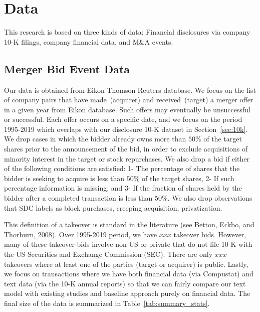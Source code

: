 \documentclass[11pt]{article}
\begin{document}
\section{Data}

This research is based on three kinds of data: Financial disclosures via
company 10-K filings, company financial data, and M\&A events.



\subsection{Merger Bid Event Data}

Our data is obtained from Eikon Thomson Reuters database. We focus on
the list of company pairs that have made~(acquirer) and received~(target) a merger offer in a given year from Eikon
database. Such offers may eventually be unsuccessful or successful. Each offer occurs on a specific date, and we focus on the period
1995-2019 which overlaps with our disclosure 10-K dataset in
Section~\ref{sec:10k}. We drop cases in which the bidder already owns more than $50\%$ of the target shares prior to
the announcement of the bid, in order to exclude acquisitions of
minority interest in the target or stock repurchases. We also drop a bid if either of the following conditions are
satisfied: 1- The percentage of shares that the bidder is seeking to acquire is less than $50\%$ of the target shares, 2- If
such percentage information is missing, and 3- If the fraction of shares held by the bidder after a completed
transaction is less than $50\%$. We also drop observations that SDC labels as block purchases, creeping
acquisition, privatization.

This definition of a takeover is standard in the literature (see Betton, Eckbo, and Thorburn, 2008).
Over 1995-2019 period, we have $xxx$ takeover bids. However, many of these takeover bids involve non-US or private that do
not file 10-K with the US Securities and Exchange Commission
(SEC). There are only $xxx$ takeovers where at least one of the parties
(target or acquirer) is public. Lastly, we focus on transactions where we have
both financial data (via Compustat) and text data (via the 10-K annual reports) so that
we can fairly compare our text model with existing studies and
baseline approach purely on financial data. The final size of the data is
summarized in Table~\ref{tab:summary_stats}.
\end{document}
